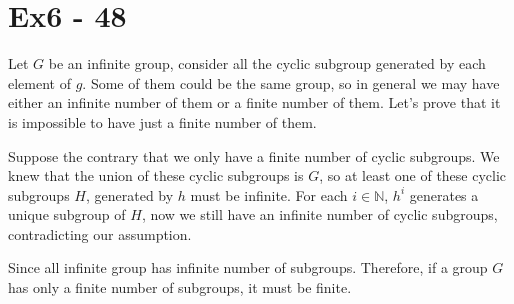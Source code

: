 \section*{Ex6 - 48}
Let $ G $ be an infinite group, consider all the cyclic subgroup generated by each element of $ g $. Some of them could be the same group, so in general we may have either an infinite number of them or a finite number of them. Let's prove that it is impossible to have just a finite number of them.

Suppose the contrary that we only have a finite number of cyclic subgroups. We knew that the union of these cyclic subgroups is $ G $, so at least one of these cyclic subgroups $ H $, generated by $ h $ must be infinite. For each $ i \in \mathbb{N} $, $ h^i $ generates a unique subgroup of $ H $, now we still have an infinite number of cyclic subgroups, contradicting our assumption.

Since all infinite group has infinite number of subgroups. Therefore, if a group $ G $ has only a finite number of subgroups, it must be finite.